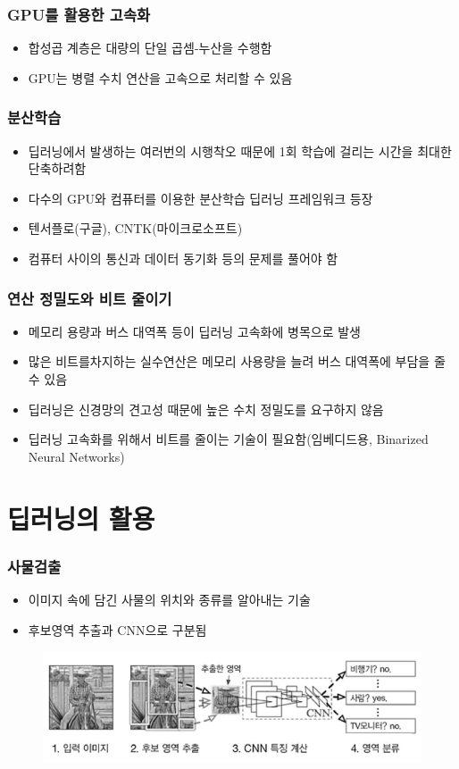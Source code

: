 \documentclass{beamer}
\begin{document}
\begin{frame}
	\frametitle{GPU를 활용한 고속화}
		\begin{itemize}
			\item 합성곱 계층은 대량의 단일 곱셈-누산을 수행함
			\item GPU는 병렬 수치 연산을 고속으로 처리할 수 있음
		\end{itemize}
\end{frame}

\begin{frame}
	\frametitle{분산학습}
		\begin{itemize}
			\item 딥러닝에서 발생하는 여러번의 시행착오 때문에 1회 학습에 걸리는 시간을 최대한 단축하려함
			\item 다수의 GPU와 컴퓨터를 이용한 분산학습 딥러닝 프레임워크 등장
			\item 텐서플로(구글), CNTK(마이크로소프트)
			\item 컴퓨터 사이의 통신과 데이터 동기화 등의 문제를 풀어야 함
		\end{itemize}
\end{frame}

\begin{frame}
	\frametitle{연산 정밀도와 비트 줄이기}
		\begin{itemize}
			\item 메모리 용량과 버스 대역폭 등이 딥러닝 고속화에 병목으로 발생
			\item 많은 비트를차지하는 실수연산은 메모리 사용량을 늘려 버스 대역폭에 부담을 줄 수 있음
			\item 딥러닝은 신경망의 견고성 때문에 높은 수치 정밀도를 요구하지 않음
			\item 딥러닝 고속화를 위해서 비트를 줄이는 기술이 필요함(임베디드용, Binarized Neural Networks)
		\end{itemize}
\end{frame}

\section{딥러닝의 활용}
\begin{frame}
	\frametitle{사물검출}
	\begin{itemize}
		\item 이미지 속에 담긴 사물의 위치와 종류를 알아내는 기술
		\item 후보영역 추출과 CNN으로 구분됨
	\end{itemize}
		\begin{figure}
			\includegraphics[width=0.8\columnwidth]{Fig_deep/Figure_11.pdf}
		\end{figure}
\end{frame}
\end{document}
